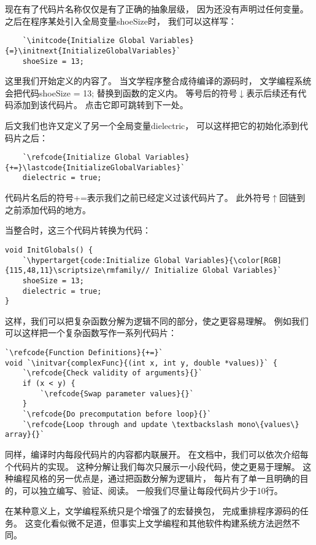 现在有了代码片名称仅仅是有了正确的抽象层级，
因为还没有声明过任何变量。
之后在程序某处引入全局变量{\ttfamily shoeSize}时，
我们可以这样写：
\begin{lstlisting}
    `\initcode{Initialize Global Variables}{=}\initnext{InitializeGlobalVariables}`
    shoeSize = 13;
\end{lstlisting}

这里我们开始定义的内容了。
当文学程序整合成待编译的源码时，
文学编程系统会把代码{\ttfamily shoeSize = 13;}
替换到函数的定义内。
等号后的符号{\codecolor $\downarrow$}表示后续还有代码添加到该代码片。
点击它即可跳转到下一处。

后文我们也许又定义了另一个全局变量{\ttfamily dielectric}，
可以这样把它的初始化添到代码片之后：
\begin{lstlisting}
    `\refcode{Initialize Global Variables}{+=}\lastcode{InitializeGlobalVariables}`
    dielectric = true;
\end{lstlisting}

代码片名后的符号{\codecolor +=}表示我们之前已经定义过该代码片了。
此外符号{\codecolor $\uparrow$}回链到
之前添加代码的地方。

当整合时，这三个代码片转换为代码：
\begin{lstlisting}
void InitGlobals() {
    `\hypertarget{code:Initialize Global Variables}{\color[RGB]{115,48,11}\scriptsize\rmfamily// Initialize Global Variables}`
    shoeSize = 13;
    dielectric = true;
}
\end{lstlisting}

这样，我们可以把复杂函数分解为逻辑不同的部分，使之更容易理解。
例如我们可以这样把一个复杂函数写作一系列代码片：
\begin{lstlisting}
`\refcode{Function Definitions}{+=}`
void `\initvar{complexFunc}{(int x, int y, double *values)}` {
    `\refcode{Check validity of arguments}{}`
    if (x < y) {
        `\refcode{Swap parameter values}{}`
    }
    `\refcode{Do precomputation before loop}{}`
    `\refcode{Loop through and update \textbackslash mono\{values\} array}{}`
\end{lstlisting}

同样，编译时内每段代码片的内容都内联展开。
在文档中，我们可以依次介绍每个代码片的实现。
这种分解让我们每次只展示一小段代码，使之更易于理解。
这种编程风格的另一优点是，通过把函数分解为逻辑片，
每片有了单一且明确的目的，可以独立编写、验证、阅读。
一般我们尽量让每段代码片少于10行。

在某种意义上，文学编程系统只是个增强了的宏替换包，
完成重排程序源码的任务。
这变化看似微不足道，但事实上文学编程和其他软件构建系统方法迥然不同。

